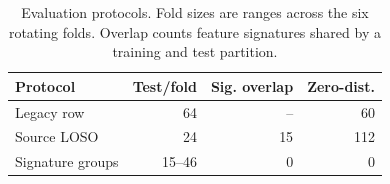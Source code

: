 \begin{table}[t]
\caption{\label{tab:protocols}Evaluation protocols. Fold sizes are ranges across the six rotating folds. Overlap counts feature signatures shared by a training and test partition.}
\centering\scriptsize
\begin{tabular}{lrrr}
\toprule
Protocol & Test/fold & Sig. overlap & Zero-dist.\\
\midrule
Legacy row & 64 & -- & 60\\
Source LOSO & 24 & 15 & 112\\
Signature groups & 15--46 & 0 & 0\\
\bottomrule
\end{tabular}
\end{table}
